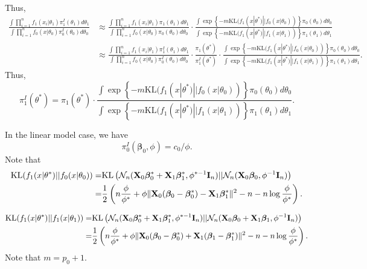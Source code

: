 \documentclass[11pt]{article}
\newcommand{\bfsym}[1]{\ensuremath{\boldsymbol{#1}}}
\def\bbeta{\bfsym \beta}
\theoremstyle{plain}
\theoremstyle{definition}
\theoremstyle{remark}
\begin{document}
Thus,
\begin{equation*}
    \begin{split}
    \frac{\int  \prod_{i=1}^n f_1(x_i|\theta_1) \pi_1^I(\theta_1) d\theta_1}{\int \prod_{i=1}^n f_0(x|\theta_0) \pi_0^I(\theta_0) d\theta_0} 
    &\approx
    \frac{\int  \prod_{i=1}^n f_1(x_i|\theta_1) \pi_1(\theta_1) d\theta_1}{\int \prod_{i=1}^n f_0(x|\theta_0) \pi_0(\theta_0) d\theta_0} 
    \cdot
    \frac{\int \exp\left\{-m \text{KL}(f_1(x|\theta^*)||f_0(x|\theta_0))\right\} \pi_0(\theta_0) d\theta_0}
    {\int 
\exp\left\{-m \text{KL}(f_1(x|\theta^*)||f_1(x|\theta_1))\right\}
     \pi_1(\theta_1) d\theta_1}
     \\
     &
    \approx
    \frac{\int  \prod_{i=1}^n f_1(x_i|\theta_1) \pi_1^I(\theta_1) d\theta_1}{\int \prod_{i=1}^n f_0(x|\theta_0) \pi_0^I(\theta_0) d\theta_0} 
    \cdot
    \frac{\pi_1(\theta^*)}{\pi_1^I(\theta^*)}
    \cdot
    \frac{\int \exp\left\{-m \text{KL}(f_1(x|\theta^*)||f_0(x|\theta_0))\right\} \pi_0(\theta_0) d\theta_0}
    {\int 
\exp\left\{-m \text{KL}(f_1(x|\theta^*)||f_1(x|\theta_1))\right\}
     \pi_1(\theta_1) d\theta_1}.
    \end{split}
\end{equation*}
Thus,
\begin{equation*}
    \pi_1^I(\theta^*)=\pi_1(\theta^*)
    \cdot
    \frac{\int \exp\left\{-m \text{KL}(f_1(x|\theta^*)||f_0(x|\theta_0))\right\} \pi_0(\theta_0) d\theta_0}
    {\int 
\exp\left\{-m \text{KL}(f_1(x|\theta^*)||f_1(x|\theta_1))\right\}
     \pi_1(\theta_1) d\theta_1}.
\end{equation*}


In the linear model case, we have
\begin{equation*}
    \pi_0^I(\bbeta_0, \phi) = c_0 / \phi.
\end{equation*}
Note that
\begin{equation*}
    \begin{split}
    \text{KL}(f_1(x|\theta^*)||f_0(x|\theta_0))
    =&
    \text{KL}\left(\mathcal N_n (\BX_0 \bbeta_0^* +\BX_1 \bbeta_1^*, \phi^{*-1} \BI_n) || \mathcal N_n (\BX_0 \bbeta_0, \phi^{-1} \BI_n)\right)
    \\
    =&
    \frac 1 2
    \left(
        n\frac{\phi}{\phi^*}
        +
            \phi\|\BX_0 (\bbeta_0-\bbeta_0^*) - \BX_1 \bbeta_1^*\|^2
            -n
        -n \log \frac{ \phi }{ \phi^* }
    \right).
    \end{split}
\end{equation*}

\begin{equation*}
    \begin{split}
    \text{KL}(f_1(x|\theta^*)||f_1(x|\theta_1))
    =&
    \text{KL}\left(\mathcal N_n (\BX_0 \bbeta_0^* +\BX_1 \bbeta_1^*, \phi^{*-1} \BI_n) || \mathcal N_n (\BX_0 \bbeta_0 + \BX_1 \bbeta_1, \phi^{-1} \BI_n)\right)
    \\
    =&
    \frac 1 2
    \left(
        n\frac{\phi}{\phi^*}
        +
        \phi\|\BX_0 (\bbeta_0-\bbeta_0^*) + \BX_1 (\bbeta_1-\bbeta_1^*)\|^2
            -n
        -n \log \frac{ \phi }{ \phi^* }
    \right).
    \end{split}
\end{equation*}
Note that $m=p_0+1$.
\end{document}
